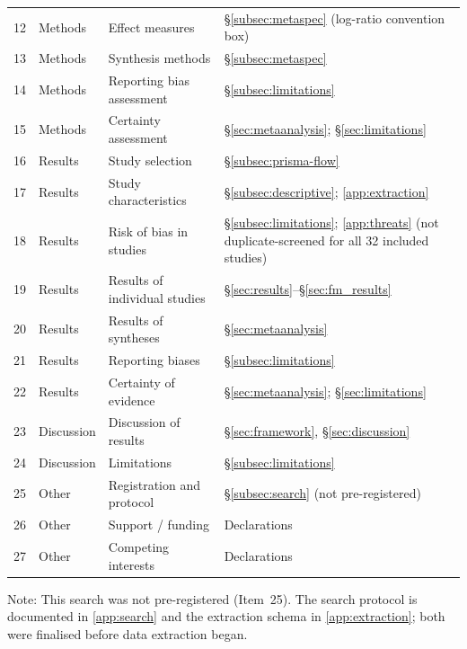 \begin{table}[htbp]
\begin{tabular}{rllp{5.8cm}}
12 & Methods      & Effect measures                                   & \S\ref{subsec:metaspec} (log-ratio convention box) \\
13 & Methods      & Synthesis methods                                 & \S\ref{subsec:metaspec} \\
14 & Methods      & Reporting bias assessment                         & \S\ref{subsec:limitations} \\
15 & Methods      & Certainty assessment                              & \S\ref{sec:metaanalysis}; \S\ref{sec:limitations} \\
16 & Results      & Study selection                                   & \S\ref{subsec:prisma-flow} \\
17 & Results      & Study characteristics                             & \S\ref{subsec:descriptive}; \ref{app:extraction} \\
18 & Results      & Risk of bias in studies                           & \S\ref{subsec:limitations}; \ref{app:threats} (not duplicate-screened for all 32 included studies) \\
19 & Results      & Results of individual studies                     & \S\ref{sec:results}--\S\ref{sec:fm_results} \\
20 & Results      & Results of syntheses                              & \S\ref{sec:metaanalysis} \\
21 & Results      & Reporting biases                                  & \S\ref{subsec:limitations} \\
22 & Results      & Certainty of evidence                             & \S\ref{sec:metaanalysis}; \S\ref{sec:limitations} \\
23 & Discussion   & Discussion of results                             & \S\ref{sec:framework}, \S\ref{sec:discussion} \\
24 & Discussion   & Limitations                                       & \S\ref{subsec:limitations} \\
25 & Other        & Registration and protocol                         & \S\ref{subsec:search} (not pre-registered) \\
26 & Other        & Support / funding                                 & Declarations \\
27 & Other        & Competing interests                               & Declarations \\
\bottomrule
\end{tabular}
\end{table}

Note: This search was not pre-registered (Item~25). The search protocol is
documented in \ref{app:search} and the extraction schema in
\ref{app:extraction}; both were finalised before data extraction began.
